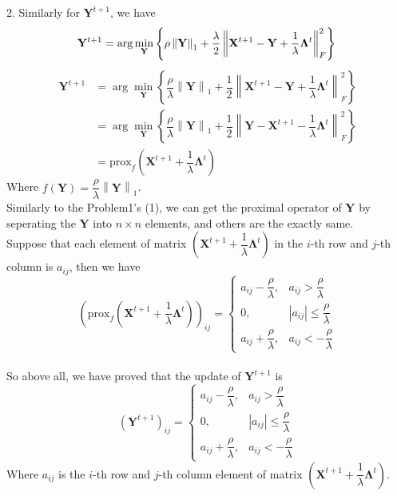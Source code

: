2. Similarly for $\mathbf{Y}^{t+1}$, we have
$$\mathbf{Y}^{t+1}=\arg\min_{\mathbf{Y}}\left\{\rho\left\|\mathbf{Y}\right\|_1+\dfrac{\lambda}{2}\left\|\mathbf{X}^{t+1}-\mathbf{Y}+\dfrac{1}{\lambda}\mathbf{\Lambda}^t\right\|_F^2\right\}\\
$$
\begin{align*}
\mathbf{Y}^{t+1} &= \arg\min_{\mathbf{Y}}\left\{\dfrac{\rho}{\lambda}\left\|\mathbf{Y}\right\|_1+\dfrac{1}{2}\left\|\mathbf{X}^{t+1}-\mathbf{Y}+\dfrac{1}{\lambda}\mathbf{\Lambda}^t\right\|_F^2\right\} \\
&= \arg\min_{\mathbf{Y}}\left\{\dfrac{\rho}{\lambda}\left\|\mathbf{Y}\right\|_1+\dfrac{1}{2}\left\|\mathbf{Y} - \mathbf{X}^{t+1} -\dfrac{1}{\lambda}\mathbf{\Lambda}^t\right\|_F^2\right\} \\
&= \text{prox}_{f}(\mathbf{X}^{t+1}+\dfrac{1}{\lambda}\mathbf{\Lambda}^t)
\end{align*}
Where $f(\mathbf{Y})=\dfrac{\rho}{\lambda}\left\|\mathbf{Y}\right\|_1$.\\
Similarly to the Problem1's (1), we can get the proximal operator of $\mathbf{Y}$ by seperating the $\mathbf{Y}$ into $n\times n$ elements, and others are the exactly same.\\
Suppose that each element of matrix $\left(\mathbf{X}^{t+1}+\dfrac{1}{\lambda}\mathbf{\Lambda}^t\right)$ in the $i$-th row and $j$-th column is $a_{ij}$, then we have
$$\left(\text{prox}_{f}\left(\mathbf{X}^{t+1}+\dfrac{1}{\lambda}\mathbf{\Lambda}^t\right)\right)_{ij} = \begin{cases}
a_{ij}-\dfrac{\rho}{\lambda}, & a_{ij} > \dfrac{\rho}{\lambda} \\
0, & |a_{ij}| \leq \dfrac{\rho}{\lambda} \\
a_{ij}+\dfrac{\rho}{\lambda}, & a_{ij} < -\dfrac{\rho}{\lambda}
\end{cases}$$\\
So above all, we have proved that the update of $\mathbf{Y}^{t+1}$ is
$$\left(\mathbf{Y}^{t+1}\right)_{ij} = \begin{cases}
a_{ij}-\dfrac{\rho}{\lambda}, & a_{ij} > \dfrac{\rho}{\lambda} \\
0, & |a_{ij}| \leq \dfrac{\rho}{\lambda} \\
a_{ij}+\dfrac{\rho}{\lambda}, & a_{ij} < -\dfrac{\rho}{\lambda}
\end{cases}$$
Where $a_{ij}$ is the $i$-th row and $j$-th column element of matrix $\left(\mathbf{X}^{t+1}+\dfrac{1}{\lambda}\mathbf{\Lambda}^t\right)$.\\


